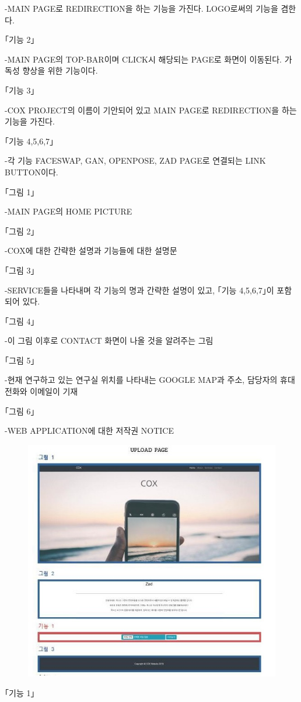 \documentclass[chapter,oneside]{oblivoir}
\begin{document}
-MAIN PAGE로 REDIRECTION을 하는 기능을 가진다. LOGO로써의 기능을 겸한다.

｢기능 2｣

-MAIN PAGE의 TOP-BAR이며 CLICK시 해당되는 PAGE로 화면이 이동된다. 가독성 향상을 위한 기능이다.

｢기능 3｣

-COX PROJECT의 이름이 기안되어 있고 MAIN PAGE로 REDIRECTION을 하는 기능을 가진다.

｢기능 4,5,6,7｣

-각 기능 FACESWAP, GAN, OPENPOSE, ZAD PAGE로 연결되는 LINK BUTTON이다.

｢그림 1｣

-MAIN PAGE의 HOME PICTURE

｢그림 2｣

-COX에 대한 간략한 설명과 기능들에 대한 설명문

｢그림 3｣

-SERVICE들을 나타내며 각 기능의 명과 간략한 설명이 있고, ｢기능 4,5,6,7｣이 포함되어 있다.

｢그림 4｣

-이 그림 이후로 CONTACT 화면이 나올 것을 알려주는 그림

｢그림 5｣

-현재 연구하고 있는 연구실 위치를 나타내는 GOOGLE MAP과 주소, 담당자의 휴대전화와 이메일이 기재

｢그림 6｣

-WEB APPLICATION에 대한 저작권 NOTICE

\newpage

\begin{figure}[h!]
    \centering
    \includegraphics{pic/chp6/img934}
\end{figure}
｢기능 1｣
\end{document}
